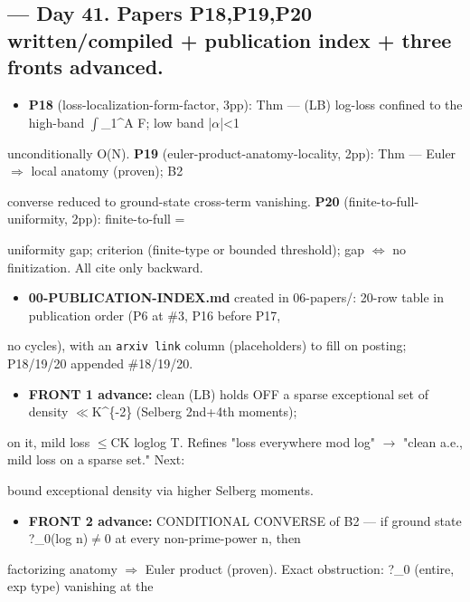 \documentclass[10pt]{article}
\begin{document}
\subsection*{ --- Day 41. Papers P18,P19,P20 written/compiled + publication index + three fronts advanced.}
\begin{itemize}
\item \textbf{P18} (loss-localization-form-factor, 3pp): Thm --- (LB) log-loss confined to the high-band \ensuremath{\int}\_1\textasciicircum{}A F; low band |\ensuremath{\alpha}|<1
\end{itemize}
  unconditionally O(N). \textbf{P19} (euler-product-anatomy-locality, 2pp): Thm --- Euler \ensuremath{\Rightarrow} local anatomy (proven); B2\par
  converse reduced to ground-state cross-term vanishing. \textbf{P20} (finite-to-full-uniformity, 2pp): finite-to-full =\par
  uniformity gap; criterion (finite-type or bounded threshold); gap \ensuremath{\iff} no finitization. All cite only backward.\par
\begin{itemize}
\item \textbf{00-PUBLICATION-INDEX.md} created in 06-papers/: 20-row table in publication order (P6 at \#3, P16 before P17,
\end{itemize}
  no cycles), with an \texttt{arxiv link} column (placeholders) to fill on posting; P18/19/20 appended \#18/19/20.\par
\begin{itemize}
\item \textbf{FRONT 1 advance:} clean (LB) holds OFF a sparse exceptional set of density \ensuremath{\ll}K\textasciicircum{}\{-2\} (Selberg 2nd+4th moments);
\end{itemize}
  on it, mild loss \ensuremath{\le}CK loglog T. Refines "loss everywhere mod log" \ensuremath{\to} "clean a.e., mild loss on a sparse set." Next:\par
  bound exceptional density via higher Selberg moments.\par
\begin{itemize}
\item \textbf{FRONT 2 advance:} CONDITIONAL CONVERSE of B2 --- if ground state ?\_0(log n)\ensuremath{\ne}0 at every non-prime-power n, then
\end{itemize}
  factorizing anatomy \ensuremath{\Rightarrow} Euler product (proven). Exact obstruction: ?\_0 (entire, exp type) vanishing at the\par
\end{document}
